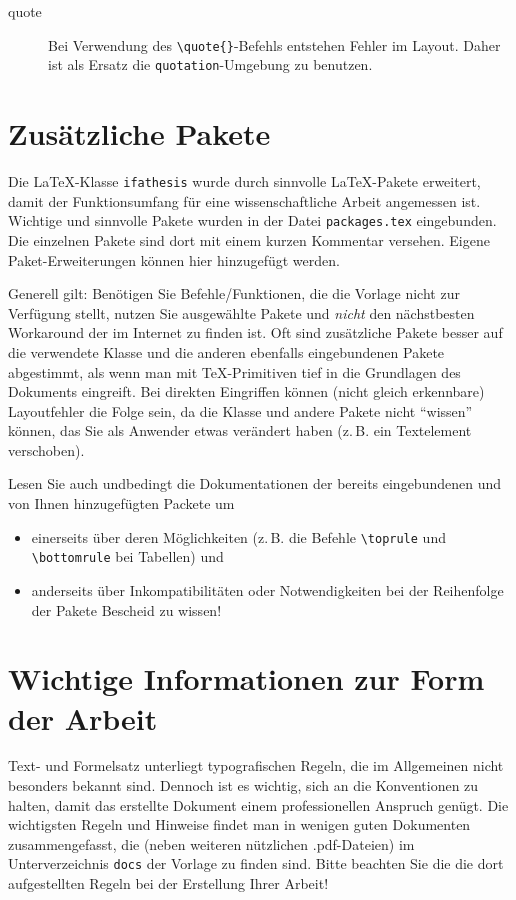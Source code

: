 \begin{description}
  \item[quote\textbraceleft\textbraceright] Bei Verwendung des
  \verb|\quote{}|-Befehls entstehen Fehler im Layout. Daher ist als Ersatz die \verb|quotation|-Umgebung zu benutzen.
\end{description}

\section{Zusätzliche Pakete}
\label{sec:ZusaetzlichePakete}

Die \LaTeX-Klasse \verb-ifathesis- wurde durch sinnvolle \LaTeX-Pakete erweitert, damit der Funktionsumfang für eine wissenschaftliche Arbeit angemessen ist. Wichtige und sinnvolle Pakete wurden in der Datei \verb-packages.tex- eingebunden. Die einzelnen Pakete sind dort mit einem kurzen Kommentar versehen. Eigene Paket-Erweiterungen können hier hinzugefügt werden.

Generell gilt: Benötigen Sie Befehle/Funktionen, die die Vorlage nicht zur Verfügung stellt, nutzen Sie ausgewählte Pakete und \emph{nicht} den nächstbesten Workaround der im Internet zu finden ist. Oft sind zusätzliche Pakete besser auf die verwendete Klasse und die anderen ebenfalls eingebundenen Pakete abgestimmt, als wenn man mit \TeX-Primitiven tief in die Grundlagen des Dokuments eingreift. Bei direkten Eingriffen können (nicht gleich erkennbare) Layoutfehler die Folge sein, da die Klasse und andere Pakete nicht "`wissen"' können, das Sie als Anwender etwas verändert haben (z.\,B. ein Textelement verschoben).

Lesen Sie auch undbedingt die Dokumentationen der bereits eingebundenen und von Ihnen hinzugefügten Packete um
\begin{itemize}
  \item einerseits über deren Möglichkeiten (z.\,B. die Befehle \verb-\toprule- und \verb-\bottomrule- bei Tabellen) und
  \item anderseits über Inkompatibilitäten oder Notwendigkeiten bei der Reihenfolge der Pakete Bescheid zu wissen!
\end{itemize}


\section{Wichtige Informationen zur Form der Arbeit}
\label{sec:WichtigeInformationenZurFormDerArbeit}

Text- und Formelsatz unterliegt typografischen Regeln, die im Allgemeinen nicht besonders bekannt sind. Dennoch ist es wichtig, sich an die Konventionen zu halten, damit das erstellte Dokument einem professionellen Anspruch genügt. Die wichtigsten Regeln und Hinweise findet man in wenigen guten Dokumenten zusammengefasst, die (neben weiteren nützlichen .pdf-Dateien) im Unterverzeichnis \verb-docs- der Vorlage zu finden sind. Bitte beachten Sie die die dort aufgestellten Regeln bei der Erstellung Ihrer Arbeit!

